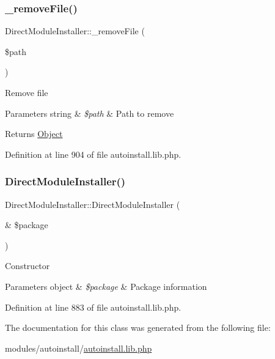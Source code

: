 \subsubsection{\texorpdfstring{\+\_\+remove\+File()}{\_removeFile()}}
{\footnotesize\ttfamily Direct\+Module\+Installer\+::\+\_\+remove\+File (\begin{DoxyParamCaption}\item[{}]{\$path }\end{DoxyParamCaption})}

Remove file


\begin{DoxyParams}[1]{Parameters}
string & {\em \$path} & Path to remove \\
\hline
\end{DoxyParams}
\begin{DoxyReturn}{Returns}
\hyperlink{classObject}{Object} 
\end{DoxyReturn}


Definition at line 904 of file autoinstall.\+lib.\+php.

\hypertarget{classDirectModuleInstaller_a713e0cebd57a87f357d05d06445508f1}{}\label{classDirectModuleInstaller_a713e0cebd57a87f357d05d06445508f1} 
\subsubsection{\texorpdfstring{Direct\+Module\+Installer()}{DirectModuleInstaller()}}
{\footnotesize\ttfamily Direct\+Module\+Installer\+::\+Direct\+Module\+Installer (\begin{DoxyParamCaption}\item[{\&}]{\$package }\end{DoxyParamCaption})}

Constructor


\begin{DoxyParams}[1]{Parameters}
object & {\em \$package} & Package information \\
\hline
\end{DoxyParams}


Definition at line 883 of file autoinstall.\+lib.\+php.



The documentation for this class was generated from the following file\+:\begin{DoxyCompactItemize}
\item 
modules/autoinstall/\hyperlink{autoinstall_8lib_8php}{autoinstall.\+lib.\+php}\end{DoxyCompactItemize}
